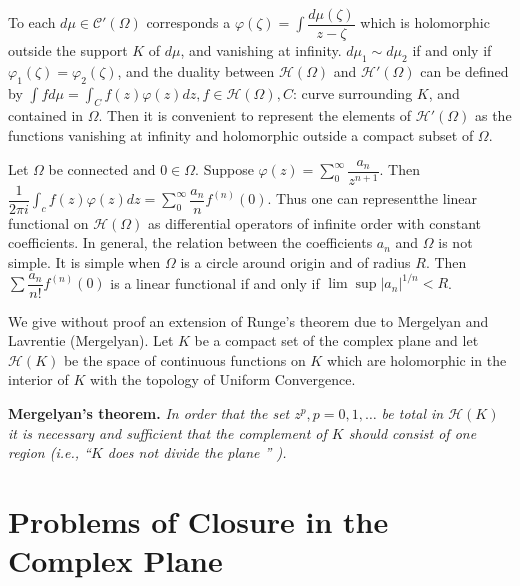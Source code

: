 \begin{remarks}\label{chap8:sec2:rem1}%
 To each $d \mu \in \mathscr{C}' (\Omega)$ corresponds a $\varphi
 (\zeta) = \int \dfrac{d \mu (\zeta)}{z - \zeta}$ which is
 holomorphic outside the support $K$ of $d \mu$, and vanishing at
 infinity. $d \mu_1 \sim d \mu_2$ if and only if $\varphi_1 (\zeta) =
 \varphi_2 (\zeta)$, and the duality between $\mathscr{H} (\Omega)$
 and $\mathscr{H}'(\Omega)$ can be defined by $\int f d \mu = \int_C
 f (z) \varphi (z) dz, f \in \mathscr{H} (\Omega), C$: curve
 surrounding $K$, and contained in $\Omega$. Then it is convenient to
 represent the elements of $\mathscr{H}' (\Omega)$ as the functions
 vanishing at infinity and holomorphic outside a compact subset of
 $\Omega$. 
\end{remarks}

\begin{remarks}\label{chap8:sec2:rem2}%
 Let $\Omega$ be connected and $0 \in \Omega$. Suppose $\varphi (z) =
 \sum\limits^\infty_{0} \dfrac{a_n}{z^{n + 1}}$. Then $\dfrac{1}{2 \pi i} \int_c
 f (z) \varphi (z) dz = \sum\limits^\infty_0 \dfrac{a_n}{n} f^{(n)}
 (0)$. Thus one can represent\pageoriginale the linear functional on $\mathscr{H}
 (\Omega)$ as differential operators of infinite order with constant
 coefficients. In general, the relation between the coefficients
 $a_n$ and $\Omega$ is not simple. It is simple when $\Omega$ is a
 circle around origin and of radius $R$. Then $\sum \dfrac{a_n}{n!}
 f^{(n)} (0)$ is a linear functional if and only if $\lim \sup
 |a_n|^{1/n} < R$. 
\end{remarks}

We give without proof an extension of Runge's theorem due to Mer\-gelyan
and Lavrentie (Mergelyan). Let $K$ be a compact set of the complex
plane and let $\mathscr{H}(K)$ be the space of continuous functions on
$K$ which are holomorphic in the interior of $K$ with the topology of
Uniform Convergence. 

\medskip
\noindent
\textbf{Mergelyan's theorem.} \textit{ In order that the set $z^p, p =
 0, 1, \ldots$ be total in $\mathscr{H}(K)$ it is necessary and
 sufficient that the complement of $K$ should consist of one region
 (i.e., ``$K$ does not divide the plane '' ).} 

\section{Problems of Closure in the Complex Plane}\label{chap8:sec3} %

